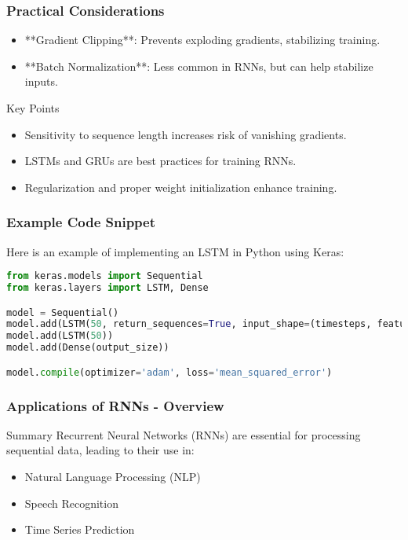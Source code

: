 \documentclass[aspectratio=169]{beamer}
\begin{document}
\begin{frame}[fragile]
    \frametitle{Practical Considerations}
    \begin{itemize}
        \item **Gradient Clipping**: Prevents exploding gradients, stabilizing training.
        \item **Batch Normalization**: Less common in RNNs, but can help stabilize inputs.
    \end{itemize}
    \begin{block}{Key Points}
        \begin{itemize}
            \item Sensitivity to sequence length increases risk of vanishing gradients.
            \item LSTMs and GRUs are best practices for training RNNs.
            \item Regularization and proper weight initialization enhance training.
        \end{itemize}
    \end{block}
\end{frame}

\begin{frame}[fragile]
    \frametitle{Example Code Snippet}
    Here is an example of implementing an LSTM in Python using Keras:
    \begin{lstlisting}[language=Python]
from keras.models import Sequential
from keras.layers import LSTM, Dense

model = Sequential()
model.add(LSTM(50, return_sequences=True, input_shape=(timesteps, features)))
model.add(LSTM(50))
model.add(Dense(output_size))

model.compile(optimizer='adam', loss='mean_squared_error')
    \end{lstlisting}
\end{frame}

\begin{frame}[fragile]
    \frametitle{Applications of RNNs - Overview}
    \begin{block}{Summary}
        Recurrent Neural Networks (RNNs) are essential for processing sequential data, leading to their use in:
        \begin{itemize}
            \item Natural Language Processing (NLP)
            \item Speech Recognition
            \item Time Series Prediction
        \end{itemize}
    \end{block}
\end{frame}
\end{document}
